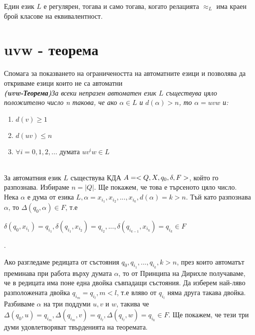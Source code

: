 \documentclass[11pt]{article}
\begin{document}
 Един език $L$ е регулярен, тогава и само тогава, когато релацията $\approx_{L}$ има краен брой класове на еквивалентност.

\section{uvw - теорема}
Спомага за показването на ограничеността на автоматните езици  и позволява да откриваме езици които не са автоматни\\
\theorem \emph{\textbf{(uvw-Теорема)}За всеки непразен автоматен език $L$ съществува цяло положително число n такова, че ако $\alpha \in L$ и $d(\alpha) > n$, то $\alpha = uvw$ и:}\\   
\renewcommand{\theenumi}{\arabic{enumi}}

\begin{enumerate}
	\item $d(v) \geq 1$
	\item $d(uv) \leq n$
	\item $\forall i = 0, 1, 2, ... $ думата $uv^{i}w \in L$
\end{enumerate}
\proof \\
За автоматния език $L$ съществува КДА $A = <Q, X, q_{0}, \delta, F>$, който го разпознава. Избираме $n = |Q|$. Ще покажем, че това е търсеното цяло число. Нека $\alpha$ е дума от езика $L, \alpha = x_{i_{1}}, x_{i_{2}}, ..., x_{i_{k}}, d(\alpha) = k > n$. Тъй като разпознава $\alpha$, то $\Delta(q_{0}, \alpha) \in F$, т.е \\
\centerline{$\delta(q_{0}, x_{i_{1}}) = q_{i_{1}}, \delta(q_{i_{1}}, x_{i_{2}}) = q_{i_{2}}, ..., \delta(q_{i_{k-1}}, x_{i_{k}}) = q_{i_{k}} \in F$}. \par

Ако разгледаме редицата от състояния $q_{0}, q_{i_{1}},...,q_{i_{k}}, k > n$, през които автоматът преминава при работа върху думата $\alpha$, то от Принципа на Дирихле получаваме, че в редицата има поне една двойка съвпадащи състояния. Да изберем най-ляво разположената двойка $q_{i_{m}} = q_{i_{l}}, m < l$, т.е вляво от $q_{i_{l}}$ няма друга такава двойка. Разбиваме $\alpha$ на три поддуми $u, v$ и $w$, такива че $\Delta(q_{0}, u) = q_{i_{m}}, \Delta(q_{i_{m}}, v) = q_{i_{l}}, \Delta(q_{i_{l}}, w) = q_{i_{k}} \in F$.
Ще покажем, че тези три думи удовлетворяват твърденията на теоремата.
\end{document}
